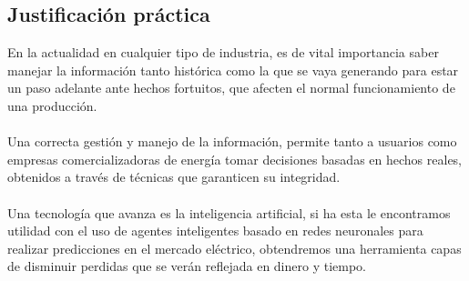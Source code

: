\subsection{Justificación práctica}
En la actualidad en cualquier tipo de industria, es de vital importancia saber manejar la información tanto histórica como la que se vaya generando para estar un paso adelante ante hechos fortuitos, que afecten el normal funcionamiento de una producción.
\\\\
Una correcta gestión y manejo de la información, permite tanto a usuarios como empresas comercializadoras de energía tomar decisiones basadas en hechos reales, obtenidos a través de técnicas que garanticen su integridad.
\\\\
Una tecnología que avanza es la inteligencia artificial, si ha esta le encontramos utilidad con el uso de agentes inteligentes basado en redes neuronales para realizar predicciones en el mercado eléctrico, obtendremos una herramienta capas de disminuir perdidas que se verán reflejada en dinero y tiempo.

	



